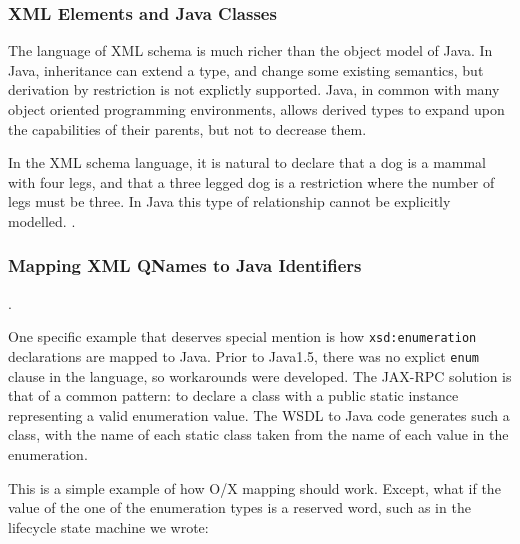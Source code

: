 \subsubsection{XML Elements and Java Classes}
\label{objections:o-x:xml-classes}

The language of XML schema is much richer than the object model of
Java. In Java, inheritance can extend a type, and change some existing
semantics, but derivation by restriction is not explictly
supported. Java, in common with many object oriented programming
environments, allows derived types to expand upon the capabilities of
their parents, but not to decrease them.

In the XML schema language, it is natural to declare that a dog is a
mammal with four legs, and that a three legged dog is a restriction
where the number of legs must be three. In Java this type of
relationship cannot be explicitly modelled. .


\subsubsection{Mapping XML QNames to Java Identifiers}
\label{objections:o-x:names}

.

One specific example that deserves special mention is how
\verb$xsd:enumeration$ declarations are mapped to Java. Prior to
Java1.5, there was no explict \verb$enum$ clause in the language, so
workarounds were developed. The JAX-RPC solution is that of a common
pattern: to declare a class with a public static instance representing
a valid enumeration value. The WSDL to Java code generates such a
class, with the name of each static class taken from the name of each
value in the enumeration.

This is a simple example of how O/X mapping should work. Except, what if the
value of the one of the enumeration types is a reserved word, such as in the
lifecycle state machine we wrote:

